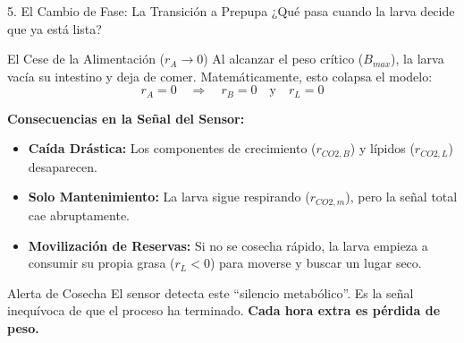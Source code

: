 \documentclass[aspectratio=169, 10pt]{beamer}
\begin{document}
\begin{frame}{5. El Cambio de Fase: La Transición a Prepupa}
    ¿Qué pasa cuando la larva decide que ya está lista?

    \begin{block}{El Cese de la Alimentación ($r_A \to 0$)}
        Al alcanzar el peso crítico ($B_{max}$), la larva vacía su intestino y deja de comer. Matemáticamente, esto colapsa el modelo:
        $$ r_A = 0 \quad \Rightarrow \quad r_B = 0 \quad \text{y} \quad r_L = 0 $$
    \end{block}

    \vspace{0.3cm}

    \textbf{Consecuencias en la Señal del Sensor:}
    \begin{itemize}
        \item \textbf{Caída Drástica:} Los componentes de crecimiento ($r_{CO2,B}$) y lípidos ($r_{CO2,L}$) desaparecen.
        \item \textbf{Solo Mantenimiento:} La larva sigue respirando ($r_{CO2,m}$), pero la señal total cae abruptamente.
        \item \textbf{Movilización de Reservas:} Si no se cosecha rápido, la larva empieza a consumir su propia grasa ($r_L < 0$) para moverse y buscar un lugar seco.
    \end{itemize}

    \vspace{0.2cm}
    \begin{alertblock}{Alerta de Cosecha}
        El sensor detecta este ``silencio metabólico''. Es la señal inequívoca de que el proceso ha terminado. \textbf{Cada hora extra es pérdida de peso.}
    \end{alertblock}
\end{frame}
\end{document}
